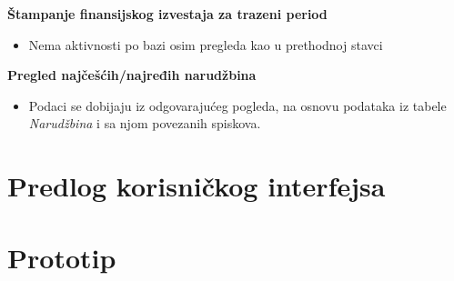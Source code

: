 \documentclass{article}
\begin{document}
\textbf{Štampanje finansijskog izvestaja za trazeni period}
\begin{itemize}
\item Nema aktivnosti po bazi osim pregleda kao u prethodnoj stavci 
\end{itemize}

\textbf{Pregled najčešćih/najređih narudžbina}
\begin{itemize}
\item Podaci se dobijaju iz odgovarajućeg pogleda, na osnovu podataka iz tabele \emph{Narudžbina} i sa njom povezanih spiskova.
\end{itemize}


\section{Predlog korisničkog interfejsa}


\section{Prototip}
\end{document}

